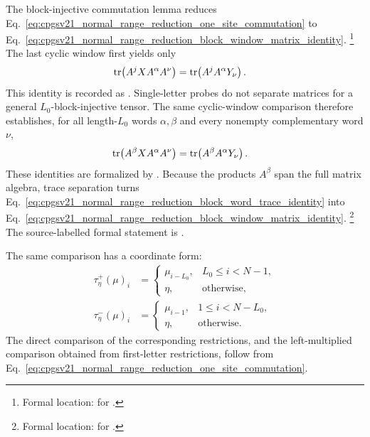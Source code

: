 \documentclass{article}
\begin{document}
The block-injective commutation lemma reduces
Eq.~\ref{eq:cpgsv21_normal_range_reduction_one_site_commutation} to
Eq.~\ref{eq:cpgsv21_normal_range_reduction_block_window_matrix_identity}.
\footnote{Formal location:
 for
.}
The last cyclic window first yields only
\begin{align}
    \operatorname{tr}\!\left(A^jXA^\alpha A^\nu\right)
        &=
    \operatorname{tr}\!\left(A^jA^\alpha Y_\nu\right).
    \label{eq:cpgsv21_normal_range_reduction_single_letter_trace_rotation}
\end{align}
This identity is recorded as
.
Single-letter probes do not separate matrices for a general
$L_0$-block-injective tensor. The same cyclic-window comparison therefore
establishes, for all length-$L_0$ words $\alpha,\beta$ and every nonempty
complementary word $\nu$,
\begin{align}
    \operatorname{tr}\!\left(A^\beta XA^\alpha A^\nu\right)
        &=
    \operatorname{tr}\!\left(A^\beta A^\alpha Y_\nu\right).
    \label{eq:cpgsv21_normal_range_reduction_block_word_trace_identity}
\end{align}
These identities are formalized by
.
Because the products $A^\beta$ span the full matrix algebra, trace separation
turns Eq.~\ref{eq:cpgsv21_normal_range_reduction_block_word_trace_identity}
into
Eq.~\ref{eq:cpgsv21_normal_range_reduction_block_window_matrix_identity}.
\footnote{Formal location:
 for
.}
The source-labelled formal statement is
.

The same comparison has a coordinate form:
\begin{align}
    \tau^{+}_{\eta}(\mu)_i
        &=
        \begin{cases}
            \mu_{i-L_0}, & L_0\leq i<N-1,\\
            \eta, & \text{otherwise},
        \end{cases}
    \label{eq:cpgsv21_normal_range_reduction_positive_boundary_word}\\
    \tau^{-}_{\eta}(\mu)_i
        &=
        \begin{cases}
            \mu_{i-1}, & 1\leq i<N-L_0,\\
            \eta, & \text{otherwise}.
        \end{cases}
    \label{eq:cpgsv21_normal_range_reduction_negative_boundary_word}
\end{align}
The direct comparison of the corresponding restrictions, and the
left-multiplied comparison obtained from first-letter restrictions, follow
from Eq.~\ref{eq:cpgsv21_normal_range_reduction_one_site_commutation}.
\end{document}
